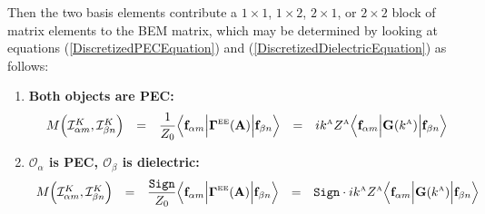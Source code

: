 \documentclass[letterpaper]{article}
\begin{document}
Then the two basis elements contribute a 
$1\times 1$, $1\times 2$, $2\times 1$, or $2\times 2$
block of matrix elements to the BEM matrix, which may be determined
by looking at equations 
(\ref{DiscretizedPECEquation}) 
and 
(\ref{DiscretizedDielectricEquation}) 
as follows:
\begin{enumerate}
\item \textbf{Both objects are PEC:}
$$\begin{array}{lclcl}
   M\Big( \mathcal{I}^K_{\alpha m}, \mathcal{I}^K_{\beta n} \Big) 
  &=&
  \displaystyle{ \frac{1}{Z_0} 
                 \Big\langle 
                 \vb f_{\alpha m} 
                 \Big| \BG\supt{EE}(\vb A) \Big|
                 \vb f_{\beta n} 
                 \Big\rangle
               }
  &=&
  \displaystyle{
  ik\supt{A} Z\supt{A}
                \Big\langle 
                \vb f_{\alpha m} 
                \Big| \vb G(k\supt{A}) \Big|
                \vb f_{\beta n} 
                \Big\rangle
               }
\end{array}$$
\item \textbf{ $\mathcal{O}_\alpha$ is PEC, 
               $\mathcal{O}_\beta$ is dielectric:}
$$\begin{array}{lclcl}
 M\Big( \mathcal{I}^K_{\alpha m}, \mathcal{I}^K_{\beta n} \Big) 
  &=& 
  \displaystyle{ \frac{\texttt{Sign}}{Z_0} 
                 \Big\langle \vb f_{\alpha m} 
                 \Big| \BG\supt{EE}(\vb A) \Big|
                 \vb f_{\beta n} 
                 \Big\rangle
               }
  &=&
  \displaystyle{ \texttt{Sign}\cdot ik\supt{A} Z\supt{A}
                 \Big\langle \vb f_{\alpha m} 
                 \Big| \vb G(k\supt{A}) \Big|
                 \vb f_{\beta n} 
                 \Big\rangle
               }
\\[10pt]

\end{array}$$
\end{enumerate}
\end{document}
